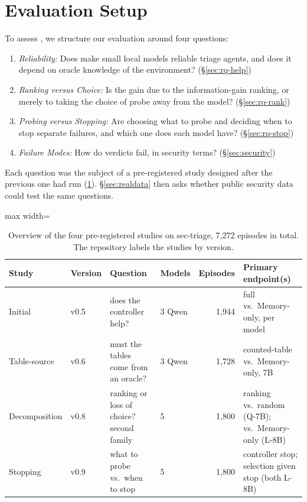 \section{Evaluation Setup}
\label{sec:setup}

To assess \hesp{}, we structure our evaluation around four questions:
\begin{enumerate}
  \item \emph{Reliability:} Does \hesp{} make small local models reliable triage agents, and does it depend on oracle knowledge of the environment? (\S\ref{sec:rq-help})
  \item \emph{Ranking versus Choice:} Is the gain due to the information-gain ranking, or merely to taking the choice of probe away from the model? (\S\ref{sec:rq-rank})
  \item \emph{Probing versus Stopping:} Are choosing what to probe and deciding when to stop separate failures, and which one does each model have? (\S\ref{sec:rq-stop})
  \item \emph{Failure Modes:} How do verdicts fail, in security terms? (\S\ref{sec:security})
\end{enumerate}
Each question was the subject of a pre-registered study designed after the previous one had run (\cref{tab:studies}). \S\ref{sec:realdata} then asks whether public security data could test the same questions.

\begin{table}[t]
  \caption{Overview of the four pre-registered studies on sec-triage, 7{,}272 episodes in total. The repository labels the studies by version.}
  \label{tab:studies}
  \centering\small
  \begin{adjustbox}{max width=\textwidth}
  \begin{tabular}{llllrl}
    \toprule
    Study & Version & Question & Models & Episodes & Primary endpoint(s) \\
    \midrule
    Initial & v0.5 & does the controller help? & 3 Qwen & 1{,}944 & full \hesp{} vs.\ Memory-only, per model \\
    Table-source & v0.6 & must the tables come from an oracle? & 3 Qwen & 1{,}728 & counted-table \hesp{} vs.\ Memory-only, 7B \\
    Decomposition & v0.8 & ranking or loss of choice? second family & 5 & 1{,}800 & ranking vs.\ random (Q-7B); \hesp{} vs.\ Memory-only (L-8B) \\
    Stopping & v0.9 & what to probe vs.\ when to stop & 5 & 1{,}800 & controller stop; selection given stop (both L-8B) \\
    \bottomrule
  \end{tabular}
  \end{adjustbox}
\end{table}

